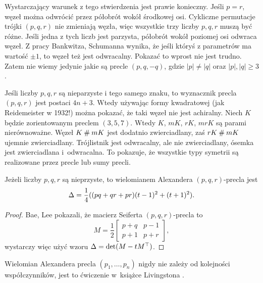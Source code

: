 Wystarczający warunek z tego stwierdzenia jest prawie konieczny.
Jeśli $p = r$, węzeł można odwrócić przez półobrót wokół środkowej osi.
Cykliczne permutacje trójki $(p, q, r)$ nie zmieniają węzła, więc wszystkie trzy liczby $p, q, r$ muszą być różne.
Jeśli jedna z tych liczb jest parzysta, półobrót wokół poziomej osi odwraca węzeł.
Z pracy Bankwitza, Schumanna \cite{bankwitz1934} wynika, że jeśli któryś z parametrów ma wartość $\pm 1$, to węzeł też jest odwracalny.
%
%
Pokazać to wprost nie jest trudno.
Zatem nie wiemy jedynie jakie są precle $(p, q, -q)$, gdzie $|p| \neq |q|$ oraz $|p|, |q| \ge 3$.

Jeśli liczby $p, q, r$ są nieparzyste i tego samego znaku, to wyznacznik precla $(p, q, r)$ jest postaci $4n+3$.
%
Wtedy używając formy kwadratowej (jak Reidemeister w 1932!) można pokazać, że taki węzeł nie jest achiralny.
Niech $K$ będzie zorientowanym preclem $(3, 5, 7)$.
Wtedy $K$, $mK$, $rK$, $mrK$ są parami nierównoważne.
Węzeł $K \mathbin{\#} mK$ jest dodatnio zwierciadlany, zaś $rK \mathbin{\#} mK$ ujemnie zwierciadlany.
Trójlistnik jest odwracalny, ale nie zwierciadlany, ósemka jest zwierciadlana i~odwracalna.
To pokazuje, że wszystkie typy symetrii są realizowane przez precle lub sumy precli.

\begin{proposition}
\label{prp:pretzel_alexander}%
%
    Jeżeli liczby $p, q, r$ są nieprzyste, to wielomianem Alexandera $(p, q, r)$-precla jest
    \begin{equation}
        \Delta = \frac 14 ((pq+qr+pr) (t-1)^2 + (t+1)^2).
    \end{equation}
\end{proposition}

\begin{proof}
%
%
    Bae, Lee \cite[lemat 3.1]{bae2020} pokazali, że macierz Seiferta $(p, q, r)$-precla to
    \begin{equation}
        M = \frac 1 2 \begin{bmatrix}
            p+q & p-1 \\
            p+1 & p+r
        \end{bmatrix},
    \end{equation}
    wystarczy więc użyć wzoru $\Delta = \det(M-tM^\top)$.
\end{proof}

Wielomian Alexandera precla $(p_1, \ldots, p_n)$ nigdy nie zależy od kolejności współczynników, jest to ćwiczenie w~książce Livingstona \cite[s. 215]{livingston1993}.

